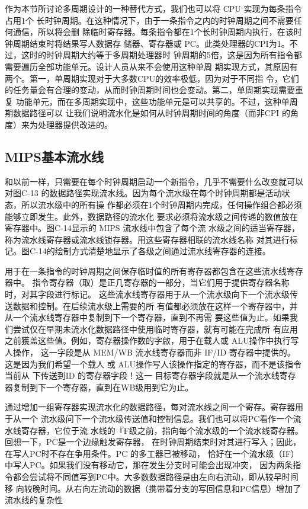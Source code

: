作为本节所讨论多周期设计的一种替代方式，我们也可以将 CPU 实现为每条指令占用1个
长时钟周期。在这种情况下，由于一条指令之内的时钟周期之间不需要任何通信，所以将会删
除临时寄存器。每条指令都在1个长时钟周期内执行，在该时钟周期结束时将结果写人数据存
储器、寄存器或 PC。此类处理器的CPI为1。不过，这时的时钟周期大约等于多周期处理器时
钟周期的5倍，这是因为所有指令都需要遍历全部功能单元。设计人员从来不会使用这种单周
期实现方式，其原因有两个。第一，单周期实现对于大多数CPU的效率极低，因为对于不同指
令，它们的任务量会有合理的变动，从而时钟周期时间也会变动。第二，单周期实现需要重复
功能单元，而在多周期实现中，这些功能单元是可以共享的。不过，这种单周期数据路径可以
让我们说明流水化是如何从时钟周期时间的角度（而非CPI 的角度）来为处理器提供改进的。

\subsection{MIPS基本流水线}

和以前一样，只需要在每个时钟周期启动一个新指令，几乎不需要什么改变就可以对图C-13
的数据路径实现流水线。因为每个流水级在每个时钟周期都是活动状态，所以流水级中的所有操
作都必须在1个时钟周期内完成，任何操作组合都必须能够立即发生。此外，数据路径的流水化
要求必须将流水级之间传递的数值放在寄存器中。图C-14显示的 MIPS 流水线中包含了每个流
水级之间的适当寄存器，称为流水线寄存器或流水线锁存器。用这些寄存器相联的流水线名称
对其进行标记。图C-14的绘制方式清楚地显示了各级之间通过流水线寄存器的连接。

用于在一条指令的时钟周期之间保存临时值的所有寄存器都包含在这些流水线寄存器中。
指令寄存器（取）是正几寄存器的一部分，当它们用于提供寄存器名称时，对其字段进行标记。
这些流水线寄存器用于从一个流水级向下一个流水级传送数据和控制。在后续流水级上需要的所
有值都必须放在这样一个寄存器中，并从一个流水线寄存器中复制到下一个寄存器，直到不再需
要这些值为止。如果我们尝试仅在早期未流水化数据路径中使用临时寄存器，就有可能在完成所
有应用之前獲盖这些值。例如，寄存器操作数的字啟，用于在载人或 ALU操作中执行写人操作，
这一字段是从 MEM/WB 流水线寄存器而非 IF/ID 寄存器中提供的。这是因为我们希望一个载人
或 ALU操作写人该操作指定的寄存器，而不是该指令当前从 下传送到ID 的寄存器字段！这一
目标寄存器字段就是从一个流水线寄存器复制到下一个寄存器，直到在WB级用到它为止。

通过增加一组寄存器实现流水化的数据路径，每对流水线之间一个寄存。寄存器用于从一个
流水级问下一个流水级传送值和控制信息。我们也可以将PC看作一个流水线寄存器，它位于流
水线的『F级之前，指向每个流水级的一个流水线寄存器。回想一下，PC是一个边缘触发寄存器，
在时钟周期结束时对其进行写入；因此，在写人PC时不存在争用条件。PC 的多工器已被移动，
恰好在一个流水级（IF）中写人PC。如果我们没有移动它，那在发生分支时可能会出现冲突，
因为两条指令都会尝试将不同值写到PC中。大多数数据路径是由左向右流动，即从较早时间移
向较晚时间。从右向左流动的数据（携带着分支的写回信息和PC信息）增加了流水线的复杂性

